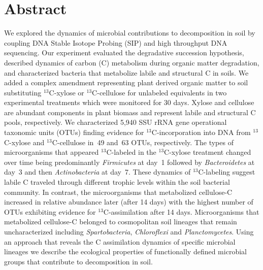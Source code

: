 \section{Abstract} We explored the dynamics of microbial contributions to
decomposition in soil by coupling DNA Stable Isotope Probing (SIP) and high
throughput DNA sequencing. Our experiment evaluated the degradative succession
hypothesis, described dynamics of carbon (C) metabolism during organic matter
degradation, and characterized bacteria that metabolize labile and structural
C in soils. We added a complex amendment representing plant derived organic
matter to soil substituting $^{13}$C-xylose or $^{13}$C-cellulose for unlabeled
equivalents in two experimental treatments which were monitored for 30 days.
Xylose and cellulose are abundant components in plant biomass and represent
labile and structural C pools, respectively. We characterized 5,940 SSU rRNA
gene operational taxonomic units (OTUs) finding evidence for
$^{13}$C-incorporation into DNA from $^{13}$C-xylose and $^{13}$C-cellulose
in~49 and~63 OTUs, respectively. The types of microorganisms that appeared
$^{13}$C-labeled in the $^{13}$C-xylose treatment changed over time being
predominantly \textit{Firmicutes} at day~1 followed by \textit{Bacteroidetes}
at day~3 and then \textit{Actinobacteria} at day~7.  These dynamics of
$^{13}$C-labeling suggest labile C traveled through different trophic levels
within the soil bacterial community. In contrast, the microorganisms that metabolized
cellulose-C increased in relative abundance later (after 14 days) 
with the highest number of OTUs exhibiting evidence for $^{13}$C-assimilation
after 14 days. Microorganisms that metabolized cellulose-C belonged to cosmopolitan
soil lineages that remain uncharacterized including \textit{Spartobacteria},
\textit{Chloroflexi} and \textit{Planctomycetes}.  Using an approach that
reveals the C assimilation dynamics of specific microbial lineages we describe
the ecological properties of functionally defined microbial groups that
contribute to decomposition in soil.
